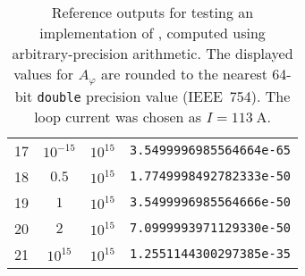 \begin{table}[htbp]
\begin{tabular}{c|c|c|c}
    17 & $10^{-15}$ & $10^{15}$  & \texttt{3.5499996985564664e-65} \\
    18 & $0.5$      & $10^{15}$  & \texttt{1.7749998492782333e-50} \\
    19 & $1$        & $10^{15}$  & \texttt{3.5499996985564666e-50} \\
    20 & $2$        & $10^{15}$  & \texttt{7.0999993971129330e-50} \\
    21 & $10^{15}$  & $10^{15}$  & \texttt{1.2551144300297385e-35}
  \end{tabular}
  \caption{Reference outputs for testing an implementation of , computed using arbitrary-precision arithmetic.
           The displayed values for $A_\varphi$ are rounded to the nearest 64-bit \texttt{double} precision value (IEEE~754).
           The loop current was chosen as $I = \SI{113}{\ampere}$.}
  \label{tab:ref_cylWireLoop}
\end{table}
